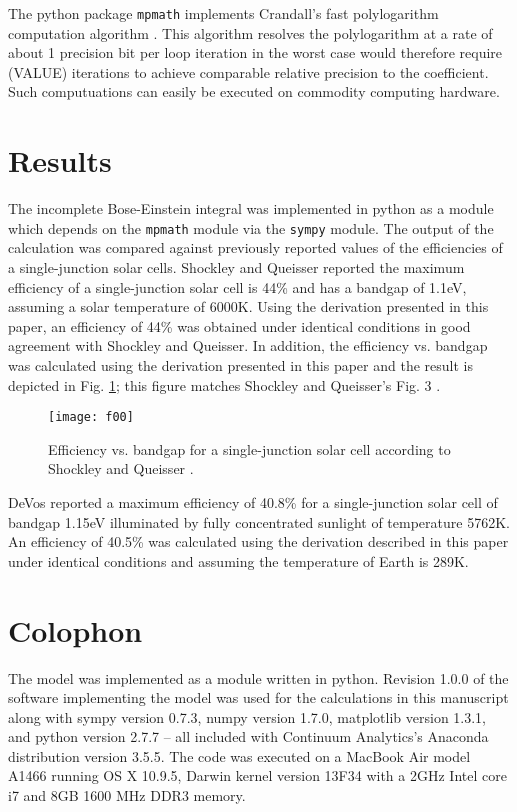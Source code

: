 \documentclass[letterpaper,12pt]{article}
\begin{document}
The python package \texttt{mpmath} \cite{} implements \cite{} Crandall's fast polylogarithm computation algorithm \cite{http://academic.reed.edu/physics/faculty/crandall/papers/Polylog}. This algorithm resolves the polylogarithm at a rate of about 1 precision bit per loop iteration in the worst case would therefore require (VALUE) iterations to achieve comparable relative precision to the coefficient. Such computuations can easily be executed on commodity computing hardware.


\section{Results}
The incomplete Bose-Einstein integral was implemented in python as a module \cite{} which depends on the \texttt{mpmath} module via the \texttt{sympy} module. The output of the calculation was compared against previously reported values of the efficiencies of a single-junction solar cells. Shockley and Queisser \cite{10.1063/1.1736034} reported the maximum efficiency of a single-junction solar cell is 44\% and has a bandgap of 1.1eV, assuming a solar temperature of 6000K. Using the derivation presented in this paper, an efficiency of 44\% was obtained under identical conditions in good agreement with Shockley and Queisser. In addition, the efficiency vs. bandgap was calculated using the derivation presented in this paper and the result is depicted in Fig. \ref{fig:00}; this figure matches Shockley and Queisser's Fig. 3 \cite{10.1063/1.1736034}.


\begin{figure}
\texttt{[image: f00]}
\caption{Efficiency vs. bandgap for a single-junction solar cell according to Shockley and Queisser \cite{10.1063/1.1736034}.}
\label{fig:00}
\end{figure}


DeVos \cite{9780198513926} reported a maximum efficiency of 40.8\% for a single-junction solar cell of bandgap 1.15eV illuminated by fully concentrated sunlight of temperature 5762K. An efficiency of 40.5\% was calculated using the derivation described in this paper under identical conditions and assuming the temperature of Earth is 289K.


\section{Colophon}
The model was implemented as a module written in python. Revision 1.0.0 \cite{} of the software implementing the model was used for the calculations in this manuscript along with sympy version 0.7.3, numpy version 1.7.0, matplotlib version 1.3.1, and python version 2.7.7 -- all included with Continuum Analytics's Anaconda distribution version 3.5.5.  The code was executed on a MacBook Air model A1466 running OS X 10.9.5, Darwin kernel version 13F34 with a 2GHz Intel core i7 and 8GB 1600 MHz DDR3 memory.
\end{document}
